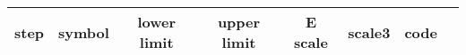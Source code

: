\documentclass{article}
\begin{document}
    


\begin{center}
  \begin{tabular}{ c c c c c c c c} 
    \hline
  step & symbol & lower limit & upper limit & E scale & scale3 & code \\
   \hline
  \end{tabular}
\end{center}
  
    
\end{document}
